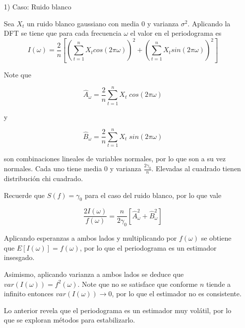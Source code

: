 \documentclass[a4paper,10pt]{article}
\begin{document}
\begin{itemize}
\item[1)] Caso: Ruido blanco

Sea $X_t$ un ruido blanco gaussiano con media 0 y varianza $\sigma^2$. 
Aplicando la DFT se tiene que para cada frecuencia $\omega$ el valor en el periodograma es
$$
I(\omega) = \frac{2}{n} [(\sum_{t = 1}^{n} X_t cos(2\pi \omega))^2 + (\sum_{t = 1}^{n} X_t sin(2\pi \omega))^2]
$$

Note que

$$
\hat{A}_{\omega} = \frac{2}{n} \sum_{t = 1}^{n} X_t \;cos(2\pi \omega)
$$

y 

$$
\hat{B}_{\omega} = \frac{2}{n} \sum_{t = 1}^{n} X_t \;sin(2\pi \omega)
$$

son combinaciones lineales de variables normales, por lo que son a su vez normales. Cada uno tiene media 0 y varianza $\frac{2\gamma_0}{n}$. Elevadas al cuadrado tienen distribuci\'on chi cuadrado. 

Recuerde que $S(f) = \gamma_0$ para el caso del ruido blanco, por lo que vale

$$
\frac{2 I(\omega)}{f(\omega)} = \frac{n}{2\gamma_0} [\hat{A}_{\omega}^{2} + \hat{B}_{\omega}^{2}]
$$

Aplicando esperanzas a ambos lados y multiplicando por $f(\omega)$ se obtiene que $E[I(\omega)] = f(\omega)$, por lo que el periodograma es un estimador insesgado.

Asimismo, aplicando varianza a ambos lados se deduce que $var(I(\omega)) = f^2(\omega)$. Note que no se satisface que conforme $n$ tiende a infinito entonces $var(I(\omega)) \rightarrow 0$, por lo que el estimador no es consistente.

%
%

Lo anterior revela que el periodograma es un estimador muy vol\'atil, por lo que se exploran m\'etodos para estabilizarlo.




\end{itemize}
\end{document}
